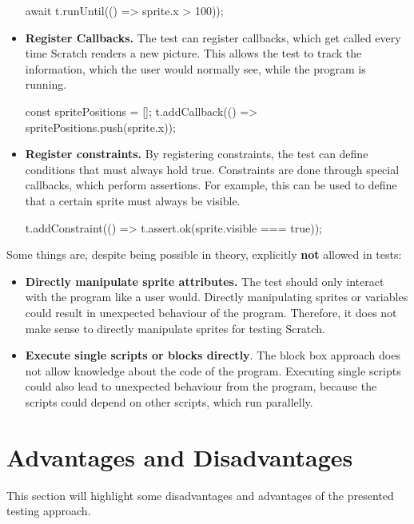 \begin{itemize}
\begin{javascriptcode}
            await t.runUntil(() => sprite.x > 100));
        \end{javascriptcode}
    \item \textbf{Register Callbacks.}
        The test can register callbacks, which get called every time Scratch renders a new picture.
        This allows the test to track the information, which the user would normally see, while the program is running.
        \begin{javascriptcode}
            const spritePositions = [];
            t.addCallback(() => spritePositions.push(sprite.x));
        \end{javascriptcode}
    \item \textbf{Register constraints.}
        By registering constraints, the test can define conditions that must always hold true.
        Constraints are done through special callbacks, which perform assertions.
        For example, this can be used to define that a certain sprite must always be visible.
        \begin{javascriptcode}
            t.addConstraint(() => t.assert.ok(sprite.visible === true));
        \end{javascriptcode}
\end{itemize}

\noindent Some things are, despite being possible in theory, explicitly \textbf{not} allowed in tests:

\begin{itemize}
    \item \textbf{Directly manipulate sprite attributes.}
        The test should only interact with the program like a user would.
        Directly manipulating sprites or variables could result in unexpected behaviour of the program.
        Therefore, it does not make sense to directly manipulate sprites for testing Scratch.
    \item \textbf{Execute single scripts or blocks directly}.
        The block box approach does not allow knowledge about the code of the program.
        Executing single scripts could also lead to unexpected behaviour from the program, because the scripts could depend on other scripts, which run parallelly.
\end{itemize}

\section{Advantages and Disadvantages}

This section will highlight some disadvantages and advantages of the presented testing approach.

